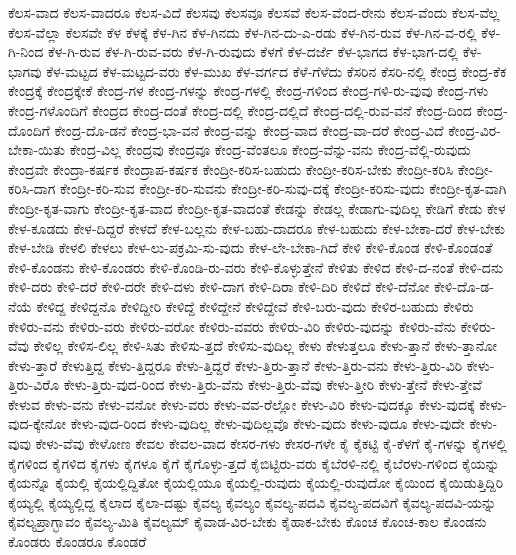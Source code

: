{ಕೆಲಸ-ವಾದ
ಕೆಲಸ-ವಾದರೂ
ಕೆಲಸ-ವಿದೆ
ಕೆಲಸವು
ಕೆಲಸವೂ
ಕೆಲಸವೆ
ಕೆಲಸ-ವೆಂದ-ರೇನು
ಕೆಲಸ-ವೆಂದು
ಕೆಲಸ-ವೆಲ್ಲ
ಕೆಲಸ-ವೆಲ್ಲಾ
ಕೆಲಸವೇ
ಕೆಳ
ಕೆಳಕ್ಕೆ
ಕೆಳ-ಗಿನ
ಕೆಳ-ಗಿನದು
ಕೆಳ-ಗಿನ-ದು-ಎ-ರಡು
ಕೆಳ-ಗಿನ-ರುವ
ಕೆಳ-ಗಿನ-ವ-ರಲ್ಲಿ
ಕೆಳ-ಗಿ-ನಿಂದ
ಕೆಳ-ಗಿ-ರುವ
ಕೆಳ-ಗಿ-ರುವ-ವರು
ಕೆಳ-ಗಿ-ರುವುದು
ಕೆಳಗೆ
ಕೆಳ-ದರ್ಜೆ
ಕೆಳ-ಭಾಗದ
ಕೆಳ-ಭಾಗ-ದಲ್ಲಿ
ಕೆಳ-ಭಾಗವು
ಕೆಳ-ಮಟ್ಟದ
ಕೆಳ-ಮಟ್ಟದ-ವರು
ಕೆಳ-ಮುಖ
ಕೆಳ-ವರ್ಗದ
ಕೆಳೆ-ಗೆಳೆದು
ಕೆಸರಿನ
ಕೆಸರಿ-ನಲ್ಲಿ
ಕೇಂದ್ರ
ಕೇಂದ್ರ-ಕೆಕ
ಕೇಂದ್ರಕ್ಕೆ
ಕೇಂದ್ರಕ್ಕೇಕೆ
ಕೇಂದ್ರ-ಗಳ
ಕೇಂದ್ರ-ಗಳನ್ನು
ಕೇಂದ್ರ-ಗಳಲ್ಲಿ
ಕೇಂದ್ರ-ಗಳಿಂದ
ಕೇಂದ್ರ-ಗಳಿ-ರು-ವುವು
ಕೇಂದ್ರ-ಗಳು
ಕೇಂದ್ರ-ಗಳೊಂದಿಗೆ
ಕೇಂದ್ರದ
ಕೇಂದ್ರ-ದಂತೆ
ಕೇಂದ್ರ-ದಲ್ಲಿ
ಕೇಂದ್ರ-ದಲ್ಲಿದೆ
ಕೇಂದ್ರ-ದಲ್ಲಿ-ರುವ-ವನೆ
ಕೇಂದ್ರ-ದಿಂದ
ಕೇಂದ್ರ-ದೊಂದಿಗೆ
ಕೇಂದ್ರ-ದೊ-ಡನೆ
ಕೇಂದ್ರ-ಭಾ-ವನೆ
ಕೇಂದ್ರ-ವನ್ನು
ಕೇಂದ್ರ-ವಾದ
ಕೇಂದ್ರ-ವಾ-ದರೆ
ಕೇಂದ್ರ-ವಿದೆ
ಕೇಂದ್ರ-ವಿರ-ಬೇಕಾ-ಯಿತು
ಕೇಂದ್ರ-ವಿಲ್ಲ
ಕೇಂದ್ರವು
ಕೇಂದ್ರವೂ
ಕೇಂದ್ರ-ವೆಂತಲೂ
ಕೇಂದ್ರ-ವೆನ್ನು-ವನು
ಕೇಂದ್ರ-ವೆಲ್ಲಿ-ರುವುದು
ಕೇಂದ್ರವೇ
ಕೇಂದ್ರಾ-ಕರ್ಷಕ
ಕೇಂದ್ರಾಪ-ಕರ್ಷಕ
ಕೇಂದ್ರೀ-ಕರಿಸ-ಬಹುದು
ಕೇಂದ್ರೀ-ಕರಿಸ-ಬೇಕು
ಕೇಂದ್ರೀ-ಕರಿಸಿ
ಕೇಂದ್ರೀ-ಕರಿಸಿ-ದಾಗ
ಕೇಂದ್ರೀ-ಕರಿ-ಸುವ
ಕೇಂದ್ರೀ-ಕರಿ-ಸುವನು
ಕೇಂದ್ರೀ-ಕರಿ-ಸುವು-ದಕ್ಕೆ
ಕೇಂದ್ರೀ-ಕರಿಸು-ವುದು
ಕೇಂದ್ರೀ-ಕೃತ-ವಾಗಿ
ಕೇಂದ್ರೀ-ಕೃತ-ವಾಗು
ಕೇಂದ್ರೀ-ಕೃತ-ವಾದ
ಕೇಂದ್ರೀ-ಕೃತ-ವಾದಂತೆ
ಕೇಡನ್ನು
ಕೇಡಲ್ಲ
ಕೇಡಾಗು-ವುದಿಲ್ಲ
ಕೇಡಿಗೆ
ಕೇಡು
ಕೇಳ
ಕೇಳ-ಕೂಡದು
ಕೇಳ-ದಿದ್ದರೆ
ಕೇಳದೆ
ಕೇಳ-ಬಲ್ಲನು
ಕೇಳ-ಬಹು-ದಾದರೂ
ಕೇಳ-ಬಹುದು
ಕೇಳ-ಬೇಕಾ-ದರೆ
ಕೇಳ-ಬೇಕು
ಕೇಳ-ಬೇಡಿ
ಕೇಳಲಿ
ಕೇಳಲು
ಕೇಳ-ಲು-ಪಕ್ರಮಿ-ಸು-ವುದು
ಕೇಳ-ಲೇ-ಬೇಕಾ-ಗಿದೆ
ಕೇಳಿ
ಕೇಳಿ-ಕೊಂಡ
ಕೇಳಿ-ಕೊಂಡಂತೆ
ಕೇಳಿ-ಕೊಂಡನು
ಕೇಳಿ-ಕೊಂಡರು
ಕೇಳಿ-ಕೊಂಡಿ-ರು-ವರು
ಕೇಳಿ-ಕೊಳ್ಳುತ್ತೇನೆ
ಕೇಳಿತು
ಕೇಳಿದ
ಕೇಳಿ-ದ-ನಂತೆ
ಕೇಳಿ-ದನು
ಕೇಳಿ-ದರು
ಕೇಳಿ-ದರೆ
ಕೇಳಿ-ದರೇ
ಕೇಳಿ-ದಳು
ಕೇಳಿ-ದಾಗ
ಕೇಳಿ-ದಿರಾ
ಕೇಳಿ-ದಿರಿ
ಕೇಳಿದೆ
ಕೇಳಿ-ದೆನೋ
ಕೇಳಿ-ದೊ-ಡ-ನೆಯೆ
ಕೇಳಿದ್ದ
ಕೇಳಿದ್ದನೊ
ಕೇಳಿದ್ದೀರಿ
ಕೇಳಿದ್ದೆ
ಕೇಳಿದ್ದೇನೆ
ಕೇಳಿದ್ದೇವೆ
ಕೇಳಿ-ಬರು-ವುದು
ಕೇಳಿರ-ಬಹುದು
ಕೇಳಿರು
ಕೇಳಿರು-ವನು
ಕೇಳಿರು-ವರು
ಕೇಳಿರು-ವರೋ
ಕೇಳಿರು-ವವರು
ಕೇಳಿರು-ವಿರಿ
ಕೇಳಿರು-ವುದನ್ನು
ಕೇಳಿರು-ವೆನು
ಕೇಳಿರು-ವೆವು
ಕೇಳಿಲ್ಲ
ಕೇಳಿಸ-ಲಿಲ್ಲ
ಕೇಳಿ-ಸಿತು
ಕೇಳಿಸು-ತ್ತದೆ
ಕೇಳಿಸು-ವುದಿಲ್ಲ
ಕೇಳು
ಕೇಳುತ್ತಲೂ
ಕೇಳು-ತ್ತಾನೆ
ಕೇಳು-ತ್ತಾನೋ
ಕೇಳು-ತ್ತಾರೆ
ಕೇಳುತ್ತಿದ್ದ
ಕೇಳು-ತ್ತಿದ್ದರೂ
ಕೇಳು-ತ್ತಿದ್ದರೆ
ಕೇಳು-ತ್ತಿರು-ತ್ತಾನೆ
ಕೇಳು-ತ್ತಿರು-ವನು
ಕೇಳು-ತ್ತಿರು-ವಿರಿ
ಕೇಳು-ತ್ತಿರು-ವಿರೊ
ಕೇಳು-ತ್ತಿರು-ವುದ-ರಿಂದ
ಕೇಳು-ತ್ತಿರು-ವೆನು
ಕೇಳು-ತ್ತಿರು-ವೆವು
ಕೇಳು-ತ್ತೀರಿ
ಕೇಳು-ತ್ತೇನೆ
ಕೇಳು-ತ್ತೇವೆ
ಕೇಳುವ
ಕೇಳು-ವನು
ಕೇಳು-ವನೋ
ಕೇಳು-ವರು
ಕೇಳು-ವವ-ರೆಲ್ಲೋ
ಕೇಳು-ವಿರಿ
ಕೇಳು-ವುದಕ್ಕೂ
ಕೇಳು-ವುದಕ್ಕೆ
ಕೇಳು-ವುದ-ಕ್ಕೇನೋ
ಕೇಳು-ವುದ-ರಿಂದ
ಕೇಳು-ವುದಿಲ್ಲ
ಕೇಳು-ವುದಿಲ್ಲವೊ
ಕೇಳು-ವುದು
ಕೇಳು-ವುದೂ
ಕೇಳು-ವುದೇ
ಕೇಳು-ವುವು
ಕೇಳು-ವೆವು
ಕೇಳೋಣ
ಕೇವಲ
ಕೇವಲ-ವಾದ
ಕೇಸರ-ಗಳು
ಕೇಸರ-ಗಳೇ
ಕೈ
ಕೈಕಟ್ಟಿ
ಕೈ-ಕೆಳಗೆ
ಕೈ-ಗಳನ್ನು
ಕೈಗಳಲ್ಲಿ
ಕೈಗಳಿಂದ
ಕೈಗಳಿದ
ಕೈಗಳು
ಕೈಗಳೂ
ಕೈಗೆ
ಕೈಗೊಳ್ಳು-ತ್ತದೆ
ಕೈಬಿಟ್ಟಿರು-ವರು
ಕೈಬೆರಳಿ-ನಲ್ಲಿ
ಕೈಬೆರಳು-ಗಳಿಂದ
ಕೈಯನ್ನು
ಕೈಯನ್ನೊ
ಕೈಯಲ್ಲಿ
ಕೈಯಲ್ಲಿದ್ದಿತೋ
ಕೈಯಲ್ಲಿಯೂ
ಕೈಯಲ್ಲಿ-ರುವುದು
ಕೈಯಲ್ಲಿ-ರುವುದೋ
ಕೈಯಿಂದ
ಕೈಯಿಡುತ್ತಿದ್ದಿರಿ
ಕೈಯ್ಯಲ್ಲಿ
ಕೈಯ್ಯಲ್ಲಿದ್ದ
ಕೈಲಾದ
ಕೈಲಾ-ದಷ್ಟು
ಕೈವಲ್ಯ
ಕೈವಲ್ಯಂ
ಕೈವಲ್ಯ-ಪದವಿ
ಕೈವಲ್ಯ-ಪದವಿಗೆ
ಕೈವಲ್ಯ-ಪದವಿ-ಯನ್ನು
ಕೈವಲ್ಯಪ್ರಾಗ್ಭಾವಂ
ಕೈವಲ್ಯ-ಮಿತಿ
ಕೈವಲ್ಯಮ್
ಕೈವಾಡ-ವಿರ-ಬೇಕು
ಕೈಹಾಕ-ಬೇಕು
ಕೊಂಚ
ಕೊಂಚ-ಕಾಲ
ಕೊಂಡನು
ಕೊಂಡರು
ಕೊಂಡರೂ
ಕೊಂಡರೆ
}

